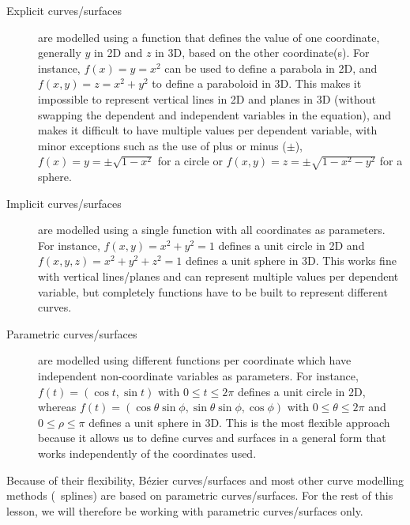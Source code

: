 \begin{description}
\item[Explicit curves/surfaces] are modelled using a function that defines the value of one coordinate, generally \(y\) in 2D and \(z\) in 3D, based on the other coordinate(s).
For instance, \(f(x)=y=x^2\) can be used to define a parabola in 2D, and \(f(x,y)=z=x^2+y^2\) to define a paraboloid in 3D.
This makes it impossible to represent vertical lines in 2D and planes in 3D (without swapping the dependent and independent variables in the equation), and makes it difficult to have multiple values per dependent variable, with minor exceptions such as the use of plus or minus (\(\pm\)), \eg\ \(f(x)=y = \pm\sqrt{1-x^2}\) for a circle or \(f(x,y)=z = \pm\sqrt{1-x^2-y^2}\) for a sphere.

\item[Implicit curves/surfaces] are modelled using a single function with all coordinates as parameters.
For instance, \(f(x,y) = x^2+y^2=1\) defines a unit circle in 2D and \(f(x,y,z)=x^2+y^2+z^2=1\) defines a unit sphere in 3D.
This works fine with vertical lines/planes and can represent multiple values per dependent variable, but completely functions have to be built to represent different curves.

\item[Parametric curves/surfaces] are modelled using different functions per coordinate which have independent non-coordinate variables as parameters.
For instance, \(f(t) = (\cos t, \sin t)\) with \(0 \leq t \leq 2\pi \) defines a unit circle in 2D, whereas \(f(t) = (\cos \theta \sin \phi , \sin \theta \sin \phi, \cos \phi)\) with \(0 \leq \theta \leq 2\pi \) and \(0 \leq \rho \leq \pi \) defines a unit sphere in 3D.
This is the most flexible approach because it allows us to define curves and surfaces in a general form that works independently of the coordinates used. 
\end{description}

Because of their flexibility, B\'ezier curves/surfaces and most other curve modelling methods (\eg\ splines) are based on parametric curves/surfaces.
For the rest of this lesson, we will therefore be working with parametric curves/surfaces only.

